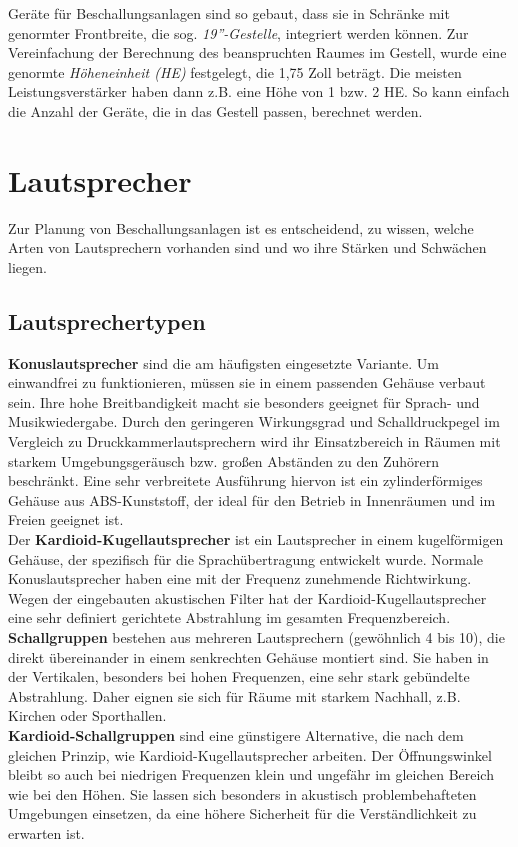 Geräte für Beschallungsanlagen sind so gebaut, dass sie in Schränke mit genormter Frontbreite, die sog. \textit{19''-Gestelle}, integriert werden können. Zur Vereinfachung der Berechnung des beanspruchten Raumes im Gestell, wurde eine genormte \textit{Höheneinheit (HE)} festgelegt, die 1,75 Zoll beträgt. Die meisten Leistungsverstärker haben dann z.B. eine Höhe von 1 bzw. 2 HE. So kann einfach die Anzahl der Geräte, die in das Gestell passen, berechnet werden.

\section{Lautsprecher}
\label{sec:Lautsprecher}
Zur Planung von Beschallungsanlagen ist es entscheidend, zu wissen, welche Arten von Lautsprechern vorhanden sind und wo ihre Stärken und Schwächen liegen.

\subsection{Lautsprechertypen}
\label{sub:Lautsprechertypen}
\textbf{Konuslautsprecher} sind die am häufigsten eingesetzte Variante. Um einwandfrei zu funktionieren, müssen sie in einem passenden Gehäuse verbaut sein. Ihre hohe Breitbandigkeit macht sie besonders geeignet für Sprach- und Musikwiedergabe. Durch den geringeren Wirkungsgrad und Schalldruckpegel im Vergleich zu Druckkammerlautsprechern wird ihr Einsatzbereich in Räumen mit starkem Umgebungsgeräusch bzw. großen Abständen zu den Zuhörern beschränkt.
Eine sehr verbreitete Ausführung hiervon ist ein zylinderförmiges Gehäuse aus ABS-Kunststoff, der ideal für den Betrieb in Innenräumen und im Freien geeignet ist.  \\
Der \textbf{Kardioid-Kugellautsprecher} ist ein Lautsprecher in einem kugelförmigen Gehäuse, der spezifisch für die Sprachübertragung entwickelt wurde. Normale Konuslautsprecher haben eine mit der Frequenz zunehmende Richtwirkung. Wegen der eingebauten akustischen Filter hat der Kardioid-Kugellautsprecher eine sehr definiert gerichtete Abstrahlung im gesamten Frequenzbereich.\\
\textbf{Schallgruppen} bestehen aus mehreren Lautsprechern (gewöhnlich 4 bis 10), die direkt übereinander in einem senkrechten Gehäuse montiert sind. Sie haben in der Vertikalen, besonders bei hohen Frequenzen, eine sehr stark gebündelte Abstrahlung. Daher eignen sie sich für Räume mit starkem Nachhall, z.B. Kirchen oder Sporthallen. \\
\textbf{Kardioid-Schallgruppen} sind eine günstigere Alternative, die nach dem gleichen Prinzip, wie Kardioid-Kugellautsprecher arbeiten. Der Öffnungswinkel bleibt so auch bei niedrigen Frequenzen klein und ungefähr im gleichen Bereich wie bei den Höhen. Sie lassen sich besonders in akustisch problembehafteten Umgebungen einsetzen, da eine höhere Sicherheit für die Verständlichkeit zu erwarten ist.

